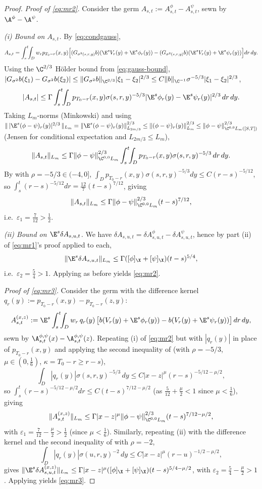 \begin{proof}
\smallskip
\emph{Proof of \eqref{eq:mr2}.} Consider the germ $A_{s,t}:=A^\phi_{s,t}-A^\psi_{s,t}$, sewn by $\A^{\phi}-\A^{\psi}$. 

\emph{(i) Bound on $A_{s,t}$.} By \eqref{eq:condgauss},
\[
A_{s,t}=\int_s^t\!\!\int_D w_r p_{T_0-r}(x,y)\Big[(G_{\sigma^2(s,r,y)}b)(\E^s V_r(y)+\E^s\phi_r(y))-(G_{\sigma^2(s,r,y)}b)(\E^s V_r(y)+\E^s\psi_r(y))\Big]dr\,dy.
\]
Using the $\C^{2/3}$ Hölder bound from \eqref{eq:gauss-bound}, $|G_{\sigma^2}b(\xi_1)-G_{\sigma^2}b(\xi_2)|\le \|G_{\sigma^2}b\|_{\C^{2/3}}|\xi_1-\xi_2|^{2/3}\le C\|b\|_{\C^{-1}}\sigma^{-5/3}|\xi_1-\xi_2|^{2/3}$,
\[
|A_{s,t}|\le \Gamma\int_s^t\!\!\int_D p_{T_0-r}(x,y)\sigma(s,r,y)^{-5/3}|\E^s\phi_r(y)-\E^s\psi_r(y)|^{2/3}\,dr\,dy.
\]
Taking $L_m$-norms (Minkowski) and using $\|\,|\E^s(\phi-\psi)_r(y)|^{2/3}\,\|_{L_m}=\|\E^s(\phi-\psi)_r(y)\|_{L_{2m/3}}^{2/3}\le \|(\phi-\psi)_r(y)\|_{L_m}^{2/3}\le \|\phi-\psi\|_{\C^{0,0}L_m([S,T])}^{2/3}$ (Jensen for conditional expectation and $L_{2m/3}\le L_m$),
\[
\|A_{s,t}\|_{L_m}\le \Gamma\|\phi-\psi\|_{\C^{0,0}L_m}^{2/3}\int_s^t\!\!\int_D p_{T_0-r}(x,y)\sigma(s,r,y)^{-5/3}\,dr\,dy.
\]
By  with $\rho=-5/3\in(-4,0]$, $\int_D p_{T_0-r}(x,y)\sigma(s,r,y)^{-5/3}dy\le C(r-s)^{-5/12}$, so $\int_s^t(r-s)^{-5/12}dr=\frac{12}{7}(t-s)^{7/12}$, giving
\[
\|A_{s,t}\|_{L_m}\le \Gamma\|\phi-\psi\|_{\C^{0,0}L_m}^{2/3}(t-s)^{7/12},
\]
i.e.\ $\varepsilon_1=\tfrac7{12}>\tfrac12$.

\emph{(ii) Bound on $\E^s\delta A_{s,u,t}$.} We have $\delta A_{s,u,t}=\delta A^\phi_{s,u,t}-\delta A^\psi_{s,u,t}$, hence by part (ii) of \eqref{eq:mr1}'s proof applied to each,
\[
\|\E^s\delta A_{s,u,t}\|_{L_m}\le \Gamma([\phi]_\X+[\psi]_\X)(t-s)^{5/4},
\]
i.e.\ $\varepsilon_2=\tfrac54>1$. Applying  as before yields \eqref{eq:mr2}.

\smallskip
\emph{Proof of \eqref{eq:mr3}.} Consider the germ with the difference kernel $q_r(y):=p_{T_0-r}(x,y)-p_{T_0-r}(z,y)$:
\[
A^{(x,z)}_{s,t}:=\E^s\int_s^t\!\!\int_D w_r\,q_r(y)\,\big[b(V_r(y)+\E^s\phi_r(y))-b(V_r(y)+\E^s\psi_r(y))\big]\,dr\,dy,
\]
sewn by $\A^{\phi,\psi}_{s,t}(x)-\A^{\phi,\psi}_{s,t}(z)$. Repeating (i) of \eqref{eq:mr2} but with $|q_r(y)|$ in place of $p_{T_0-r}(x,y)$ and applying the second inequality of  (with $\rho=-5/3$, $\mu\in(0,\tfrac16)$, $\kappa=T_0-r\ge r-s$),
\[
\int_D|q_r(y)|\sigma(s,r,y)^{-5/3}\,dy\le C|x-z|^\mu(r-s)^{-5/12-\mu/2},
\]
so $\int_s^t(r-s)^{-5/12-\mu/2}dr\le C(t-s)^{7/12-\mu/2}$ (as $\tfrac5{12}+\tfrac\mu2<1$ since $\mu<\tfrac16$), giving
\[
\|A^{(x,z)}_{s,t}\|_{L_m}\le \Gamma|x-z|^\mu\|\phi-\psi\|_{\C^{0,0}L_m}^{2/3}(t-s)^{7/12-\mu/2},
\]
with $\varepsilon_1=\tfrac7{12}-\tfrac\mu2>\tfrac12$ (since $\mu<\tfrac16$). Similarly, repeating (ii) with the difference kernel and the second inequality of  with $\rho=-2$,
\[
\int_D|q_r(y)|\sigma(u,r,y)^{-2}\,dy\le C|x-z|^\mu(r-u)^{-1/2-\mu/2},
\]
gives $\|\E^s\delta A^{(x,z)}_{s,u,t}\|_{L_m}\le \Gamma|x-z|^\mu([\phi]_\X+[\psi]_\X)(t-s)^{5/4-\mu/2}$, with $\varepsilon_2=\tfrac54-\tfrac\mu2>1$. Applying  yields \eqref{eq:mr3}.
\end{proof}

